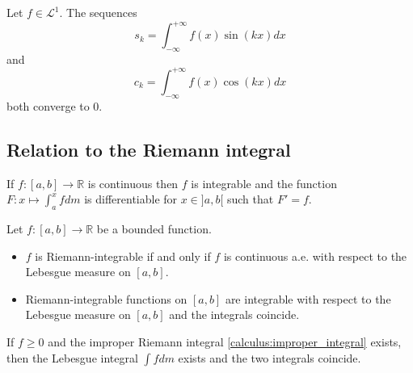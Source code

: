         \begin{theorem}\label{lebesgue:riemann_lebesue_lemma}
			Let $f\in\mathcal{L}^1$. The sequences \[s_k = \int_{-\infty}^{+\infty}f(x)\sin(kx)dx\] and \[c_k = \int_{-\infty}^{+\infty}f(x)\cos(kx)dx\] both converge to 0.
		\end{theorem}

\subsection{Relation to the Riemann integral}
	\begin{theorem}
		If $f:[a,b]\rightarrow\mathbb{R}$ is continuous then $f$ is integrable and the function $F:x\mapsto\int_a^xfdm$ is differentiable for $x\in]a,b[$ such that $F'=f$.
	\end{theorem}
    
    \begin{theorem}
		Let $f:[a,b]\rightarrow\mathbb{R}$ be a bounded function.
        \begin{itemize}
        	\item $f$ is Riemann-integrable if and only if $f$ is continuous a.e. with respect to the Lebesgue measure on $[a,b]$.
            \item Riemann-integrable functions on $[a,b]$ are integrable with respect to the Lebesgue measure on $[a,b]$ and the integrals coincide.
		\end{itemize}
	\end{theorem}
    
    \begin{theorem}
		If $f\geq0$ and the improper Riemann integral \ref{calculus:improper_integral} exists, then the Lebesgue integral $\int fdm$ exists and the two integrals coincide.
	\end{theorem}
